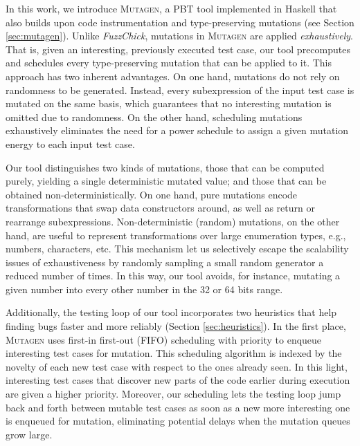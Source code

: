 \documentclass[sigconf, anonymous]{acmart}
\newcommand{\fuzzchick}{\textit{FuzzChick}\xspace}
\newcommand{\mutagen}{\textsc{Mutagen}\xspace}
\begin{document}
In this work, we introduce \mutagen, a PBT tool implemented in Haskell
that also builds upon code instrumentation and type-preserving mutations (see
Section \ref{sec:mutagen}).
%
%
%
Unlike \fuzzchick, mutations in \mutagen are applied \emph{exhaustively}.
%
That is, given an interesting, previously executed test case, our tool
precomputes and schedules every type-preserving mutation that can be applied to
it.
%
This approach has two inherent advantages. %
%
On one hand, mutations do not rely on randomness to be generated.
%
Instead, every subexpression of the input test case is mutated on the same
basis, which guarantees that no interesting mutation is omitted due to
randomness.
%
%
On the other hand, scheduling mutations exhaustively eliminates the need for a
power schedule to assign a given mutation energy to each input test case.


%
Our tool distinguishes two kinds of mutations, those that can be computed
purely, yielding a single deterministic mutated value; and those that can be
obtained non-deterministically.
%
On one hand, pure mutations encode transformations that swap data constructors
around, as well as return or rearrange subexpressions.
%
Non-deterministic (random) mutations, on the other hand, are useful to represent
transformations over large enumeration types, e.g., numbers, characters, etc.
%
This mechanism let us selectively escape the scalability issues of
exhaustiveness by randomly sampling a small random generator a reduced number of
times.
%
In this way, our tool avoids, for instance, mutating a given number into every
other number in the 32 or 64 bits range.


Additionally, the testing loop of our tool incorporates two heuristics that help
finding bugs faster and more reliably (Section \ref{sec:heuristics}).
%
In the first place, \mutagen uses first-in first-out (FIFO) scheduling with
priority to enqueue interesting test cases for mutation.
%
This scheduling algorithm is indexed by the novelty of each new test case with
respect to the ones already seen.
%
In this light, interesting test cases that discover new parts of the code
earlier during execution are given a higher priority.
%
Moreover, our scheduling lets the testing loop jump back and forth between
mutable test cases as soon as a new more interesting one is enqueued for
mutation, eliminating potential delays when the mutation queues grow large.
\end{document}
